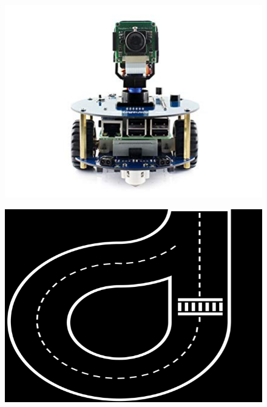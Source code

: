 \documentclass[conference]{IEEEtran}
\begin{document}
\begin{figure}[h]
\centering
\begin{minipage}{.45\linewidth}
  \centering
  \includegraphics[width=\linewidth]{alphabot2-real.jpg}
  \label{fig:alphaBot2}
\end{minipage}\quad
\begin{minipage}{.45\linewidth}
  \centering
  \includegraphics[width=\linewidth]{floor.png}
  \label{fig:floor}
\end{minipage}\newline
\begin{minipage}{.45\linewidth}
  \centering

\end{minipage}
\end{figure}
\end{document}

